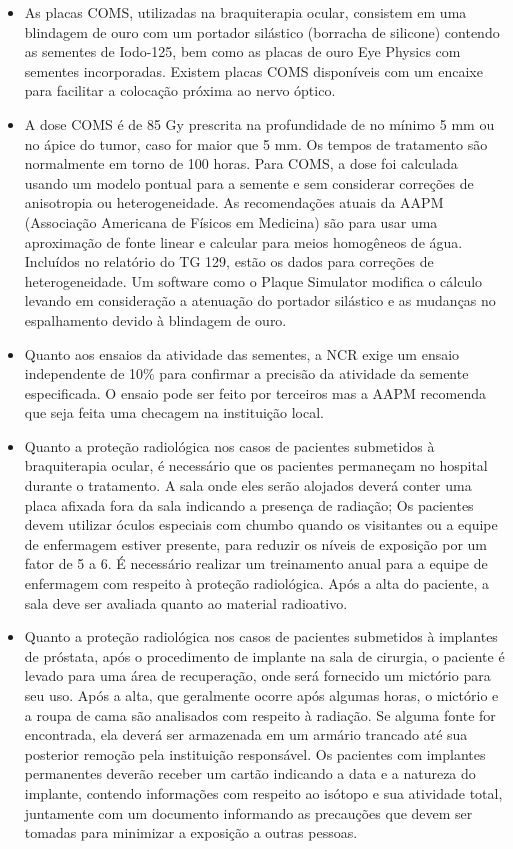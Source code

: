 \documentclass[11pt,a4paper]{article}
\newcounter{exemplo}
\begin{document}
\begin{exemplo}[Braquiterapia]
\begin{itemize}
        \item As placas COMS, utilizadas na braquiterapia ocular, consistem em uma blindagem de ouro com um portador silástico (borracha de silicone) contendo as sementes de Iodo-125, bem como as placas de ouro Eye Physics com sementes incorporadas. Existem placas COMS disponíveis com um encaixe para facilitar a colocação próxima ao nervo óptico. 
        
        \item A dose COMS é de 85 Gy prescrita na profundidade de no mínimo 5 mm ou no ápice do tumor, caso for maior que 5 mm. Os tempos de tratamento são normalmente em torno de 100 horas. Para COMS, a dose foi calculada usando um modelo pontual para a semente e sem considerar correções de anisotropia ou heterogeneidade. As recomendações atuais da AAPM (Associação Americana de Físicos em Medicina) são para usar uma aproximação de fonte linear e calcular para meios homogêneos de água. Incluídos no relatório do TG 129, estão os dados para correções de heterogeneidade. Um software como o Plaque Simulator modifica o cálculo levando em consideração a atenuação do portador silástico e as mudanças no espalhamento devido à blindagem de ouro.
        
        \item Quanto aos ensaios da atividade das sementes, a NCR exige um ensaio independente de 10\% para confirmar a precisão da atividade da semente especificada. O ensaio pode ser feito por terceiros mas a AAPM recomenda que seja feita uma checagem na instituição local.
        
        \item Quanto a proteção radiológica nos casos de pacientes submetidos à braquiterapia ocular, é necessário que os pacientes permaneçam no hospital durante o tratamento. A sala onde eles serão alojados deverá conter uma placa afixada fora da sala indicando a presença de radiação; Os pacientes devem utilizar óculos especiais com chumbo quando os visitantes ou a equipe de enfermagem estiver presente, para reduzir os níveis de exposição por um fator de 5 a 6. É necessário realizar um treinamento anual para a equipe de enfermagem com respeito à proteção radiológica. Após a alta do paciente, a sala deve ser avaliada quanto ao material radioativo. 
        
        \item Quanto a proteção radiológica nos casos de pacientes submetidos à implantes de próstata, após o procedimento de implante na sala de cirurgia, o paciente é levado para uma área de recuperação, onde será fornecido um mictório para seu uso. Após a alta, que geralmente ocorre após algumas horas, o mictório e a roupa de cama são analisados com respeito à radiação. Se alguma fonte for encontrada, ela deverá ser armazenada em um armário trancado até sua posterior remoção pela instituição responsável. Os pacientes com implantes permanentes deverão receber um cartão indicando a data e a natureza do implante, contendo informações com respeito ao isótopo e sua atividade total, juntamente com um documento informando as precauções que devem ser tomadas para minimizar a exposição a outras pessoas.
        

\end{itemize}
\end{exemplo}
\end{document}
